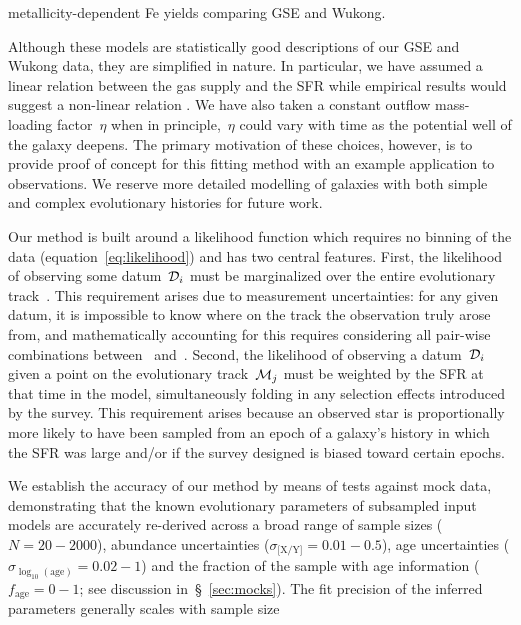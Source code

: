 \documentclass[ms.tex]{subfiles}
\begin{document}
metallicity-dependent Fe yields comparing GSE and Wukong.
\par
Although these models are statistically good descriptions of our GSE and Wukong
data, they are simplified in nature.
In particular, we have assumed a linear relation between the gas supply and the
SFR while empirical results would suggest a non-linear relation
\citep[e.g.][]{Kennicutt1998, Kennicutt2012, delosReyes2019, Kennicutt2021}.
We have also taken a constant outflow mass-loading factor~$\eta$ when in
principle,~$\eta$ could vary with time as the potential well of the galaxy
deepens.
The primary motivation of these choices, however, is to provide proof of
concept for this fitting method with an example application to observations.
We reserve more detailed modelling of galaxies with both simple and complex
evolutionary histories for future work.
\par
Our method is built around a likelihood function which requires no binning of
the data (equation~\ref{eq:likelihood}) and has two central features.
First, the likelihood of observing some datum~$\mathcal{D}_i$ must be
marginalized over the entire evolutionary track~.
This requirement arises due to measurement uncertainties: for any given datum,
it is impossible to know where on the track the observation truly arose from,
and mathematically accounting for this requires considering all pair-wise
combinations between~ and~.
Second, the likelihood of observing a datum~$\mathcal{D}_i$ given a point on
the evolutionary track~$\mathcal{M}_j$ must be weighted by the SFR at that time
in the model, simultaneously folding in any selection effects introduced by the
survey.
This requirement arises because an observed star is proportionally more likely
to have been sampled from an epoch of a galaxy's history in which the SFR was
large and/or if the survey designed is biased toward certain epochs.
\par
We establish the accuracy of our method by means of tests against mock data,
demonstrating that the known evolutionary parameters of subsampled input models
are accurately re-derived across a broad range of sample sizes
($N = 20 - 2000$), abundance uncertainties ($\sigma_\text{[X/Y]} = 0.01 - 0.5$),
age uncertainties ($\sigma_{\log_{10}(\text{age})} = 0.02 - 1$) and the
fraction of the sample with age information ($f_\text{age} = 0 - 1$; see
discussion in~\S~\ref{sec:mocks}).
The fit precision of the inferred parameters generally scales with sample size
\end{document}
